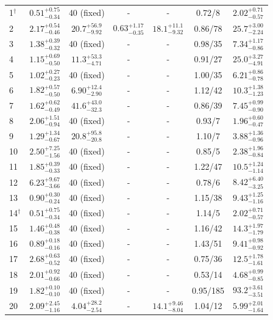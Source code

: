 \documentclass[fleqn,usenatbib]{mnras}
\begin{document}
\begin{table}
\begin{threeparttable}
\begin{spacing}{1.19}
\begin{tabular}{lcccccc}
1$^\dag$ & $0.51^{+0.75}_{-0.34}$ & 40 (fixed)  & - & - & 0.72/8  & $2.02^{+0.71}_{-0.57}$
\\
2 & $2.17^{+0.54}_{-0.46}$ & $20.7^{+56.9}_{-9.92}$ & $0.63^{+1.17}_{-0.35}$ & $18.1^{+11.1}_{-9.32}$ & 0.86/78  & $25.7^{+3.00}_{-2.24}$
\\
3 & $1.38^{+0.39}_{-0.32}$ & 40 (fixed) & - & - & 0.98/35  & $7.34^{+1.17}_{-0.86}$
\\
4 & $1.15^{+0.69}_{-0.50}$ & $11.3^{+53.3}_{-4.71}$ & - & - & 0.91/27  & $25.0^{+3.27}_{-4.91}$
\\
5 & $1.02^{+0.27}_{-0.23}$ & 40 (fixed) & - & -& 1.00/35 &  $6.21^{+0.86}_{-0.78}$
\\
6 & $1.82^{+0.57}_{-0.50}$ & $6.90^{+12.4}_{-2.90}$ 
	& - & -& 1.12/42 &  $10.3^{+1.38}_{-1.23}$
\\
7 & $1.62^{+0.62}_{-0.49}$ & $41.6^{+43.0}_{-32.3}$ & - &- & 0.86/39 &  $7.45 ^{+0.99}_{-0.90}$
\\
8 & $2.06^{+1.51}_{-0.94}$ & 40 (fixed) & - &- & 0.93/7 &  $1.96^{+0.60}_{-0.47}$
\\
9 & $1.29^{+1.34}_{-0.67}$ & $20.8^{+95.8}_{-20.8}$ & -  &- & 1.10/7 &  $3.88^{+1.36}_{-0.96}$
\\
10 & $2.50^{+7.25}_{-1.56}$ & 40 (fixed)  & - &- & 0.85/5 &  $2.38^{+1.96}_{-0.84}$
\\
11 & $1.85^{+0.39}_{-0.33}$ & 40 (fixed)  & - &- & 1.22/47 &  $10.5^{+1.24}_{-1.14}$
\\
12 & $6.23^{+9.67}_{-3.66}$ & 40 (fixed) &-&-& 0.78/6 &  $8.42^{+6.40}_{-3.25}$
\\
13 & $0.90^{+0.30}_{-0.24}$ & 40 (fixed) & - &- & 1.15/38 &  $9.43^{+1.25}_{-1.16}$
\\
14$^\dag$ & $0.51^{+0.75}_{-0.34}$ & 40 (fixed) & - &- &  1.14/5 &  $2.02^{+0.71}_{-0.57}$
\\
15 & $1.46^{+0.48}_{-0.38}$ & 40 (fixed) & - &- &  1.16/42 & $14.3^{+1.97}_{-1.79}$
\\
16 & $0.89^{+0.18}_{-0.16}$ & 40 (fixed) & - &-&  1.43/51  & $9.41^{+0.98}_{-0.92}$
\\
17 & $2.68^{+0.63}_{-0.52}$ & 40 (fixed)  & - &-&  0.75/36 & $12.5^{+1.78}_{-1.61}$
\\
18 & $2.01^{+0.92}_{-0.66}$ & 40 (fixed)  & -&- &  0.53/14  & $4.68^{+0.99}_{-0.85}$
\\
19 & $1.82^{+0.10}_{-0.10}$ & 40 (fixed)  & - &- &  0.95/185  & $93.2^{+3.61}_{-3.51}$
\\
20 & $2.09^{+2.45}_{-1.16}$ & $4.04^{+28.2}_{-2.54}$ & - &$14.1^{+9.46}_{-8.04}$ & 1.04/12  & $5.99^{+2.01}_{-1.64}$

\end{tabular}
\end{spacing}
\end{threeparttable}
\end{table}
\end{document}
